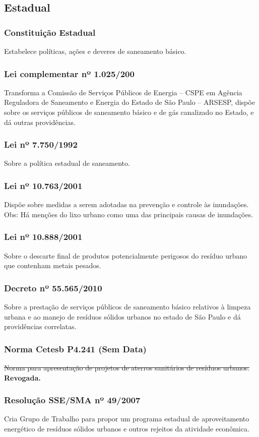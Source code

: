 \begin{subapend}
	\subsection{Estadual}
	\begin{subsubapend}
		\item \subsubsection{Constituição Estadual}
			Estabelece políticas, ações e deveres de saneamento básico.
		 \subsubsection{Lei complementar nº 1.025/200}
			Transforma a Comissão de Serviços Públicos de Energia – CSPE em Agência Reguladora de Saneamento e Energia do Estado de São Paulo – ARSESP, dispõe sobre os serviços públicos de saneamento básico e de gás canalizado no Estado, e dá outras providências.
		 \subsubsection{Lei nº 7.750/1992}
			Sobre a política estadual de saneamento.
		 \subsubsection{Lei nº 10.763/2001}
			Dispõe sobre medidas a serem adotadas na prevenção e controle às inundações. Obs: Há menções do lixo urbano como uma das principais causas de inundações.
		 \subsubsection{Lei nº 10.888/2001}
			Sobre o descarte final de produtos potencialmente perigosos do resíduo urbano que contenham metais pesados.
		 \subsubsection{Decreto nº 55.565/2010}
			Sobre a prestação de serviços públicos de saneamento básico relativos à limpeza urbana e ao manejo de resíduos sólidos urbanos no estado de São Paulo e dá providências correlatas.
		 \subsubsection{Norma Cetesb P4.241 (Sem Data)}
			\sout{Norma para apresentação de projetos de aterros sanitários de resíduos urbanos.} \textbf{Revogada.}
		 \subsubsection{Resolução SSE/SMA nº 49/2007}
			Cria Grupo de Trabalho para propor um programa estadual de aproveitamento energético de resíduos sólidos urbanos e outros rejeitos da atividade econômica.
	\end{subsubapend}
\end{subapend}

